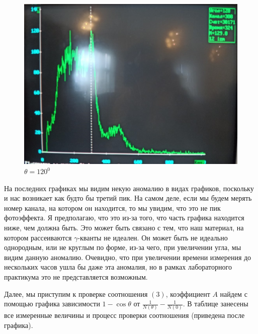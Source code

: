 \documentclass[a4paper, 12pt]{article}%
\begin{document}
\begin{figure}[h]
\begin{minipage}[h]{0.3\linewidth}
\includegraphics[width = 1\linewidth]{15.jpg}
\caption{$\theta = 120^0$}
\end{minipage}
\end{figure}

На последних графиках мы видим некую аномалию в видах графиков, поскольку и нас возникает как будто бы третий пик. На самом деле, если мы будем мерять номер канала, на котором он находится, то мы увидим, что это не пик фотоэффекта. Я предполагаю, что это из-за того, что часть графика находится ниже, чем должна быть. Это может быть связано с тем, что наш материал, на котором рассеиваются $\gamma$-кванты не идеален. Он может быть не идеально однородным, или не круглым по форме, из-за чего, при увеличении угла, мы видим данную аномалию. Очевидно, что при увеличении времени измерения до нескольких часов ушла бы даже эта аномалия, но в рамках лабораторного практикума это не представляется возможным.

Далее, мы приступим к проверке соотношения $(3)$, коэффициент $A$ найдем с помощью графика зависимости $1-\cos \theta$ от $\frac{1}{N(\theta)} - \frac{1}{N(0)}$. В таблице занесены все измеренные величины и процесс проверки соотношения (приведена после графика).
\end{document}
